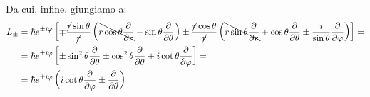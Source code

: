 \documentclass[../../FisicaTeorica.tex]{subfiles}
\begin{document}
Da cui, infine, giungiamo a:
\begin{align*}
L_\pm &= \hbar e^{\pm i\varphi} \left[
\mp \frac{\cancel{r}\sin\theta}{\cancel{r}}\left(\bcancel{r\cos\theta\frac{\partial}{\partial r}} -\sin\theta\frac{\partial}{\partial \theta}\right)
\pm \frac{\cancel{r}\cos\theta}{\cancel{r}} \left(\bcancel{r\sin\theta\frac{\partial}{\partial r}} +\cos\theta\frac{\partial}{\partial \theta}\pm\frac{i}{\sin\theta}\frac{\partial}{\partial \varphi} \right)
 \right] =\\
 &= \hbar e^{\pm i\varphi} \left[\pm \sin^2\theta\frac{\partial}{\partial \theta}
\pm \cos^2 \theta\frac{\partial}{\partial \theta} + i\cot\theta\frac{\partial}{\partial \varphi}
 \right ] =\\
 &= \hbar e^{\pm i\varphi} \left(i\cot\theta\frac{\partial}{\partial \varphi} \pm \frac{\partial}{\partial \theta}\right)
\end{align*}
\end{document}
